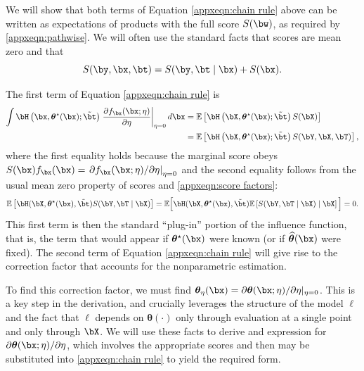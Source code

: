 \documentclass[12pt]{article}
\numberwithin{equation}{section}
\theoremstyle{definition}
\newcommand{\E}{\mathbb{E}}
\newcommand{\btheta}{\boldsymbol{\theta}}
\newcommand{\bttrue}{\btheta^\star}
\newcommand{\btstar}{\tilde{\bt}}
\newcommand{\bthat}{\bm{\widehat{\theta}}}
\begin{document}
\begin{appendices}
We will show that both terms of Equation \eqref{appxeqn:chain rule} above can be written as expectations of products with the full score $S(\bw)$, as required by \eqref{appxeqn:pathwise}. We will often use the standard facts that scores are mean zero and that 
\begin{equation}
	\label{appxeqn:score factors}
	S(\by,\bx,\bt) = S(\by,\bt \mid \bx) + S(\bx).
\end{equation}



The first term of Equation \eqref{appxeqn:chain rule} is 
\begin{align}
	\int \bH\left(\bx, \bttrue(\bx); \btstar\right) \left. \frac{\partial f_{\bx}(\bx; \eta)}{\partial \eta} \right\vert_{\eta=0} d\bx  & = \E\left[ \bH\left(\bX, \bttrue(\bx); \btstar\right) S(\bX)\right] 	  		\nonumber \\
	&  = \E\left[\bH\left(\bX, \bttrue(\bx); \btstar\right) S(\bY,\bX,\bT)\right],   		\label{appxeqn:term1}
\end{align}
where the first equality holds because the marginal score obeys $S(\bx) f_{\bx}(\bx) = \left. \partial f_{\bx}(\bx; \eta) / \partial \eta \right\vert_{\eta=0}$ and the second equality follows from the usual mean zero property of scores and \eqref{appxeqn:score factors}:
\[\E\left[\bH(\bX, \bttrue(\bx), \btstar) S(\bY,\bT \mid \bX) \right] = \E\Big[\bH(\bX, \bttrue(\bx), \btstar) \E\left[  S(\bY,\bT \mid \bX) \mid \bX \right] \Big] = 0.\]
This first term is then the standard ``plug-in'' portion of the influence function, that is, the term that would appear if $\bttrue(\bx)$ were known (or if $\bthat(\bx)$ were fixed). The second term of Equation \eqref{appxeqn:chain rule} will give rise to the correction factor that accounts for the nonparametric estimation.

To find this correction factor, we must find $\btheta_{\eta}(\bx) = \partial \btheta(\bx;\eta) / \partial \eta \vert_{\eta=0}$. This is a key step in the derivation, and crucially leverages the structure of the model $\ell$ and the fact that $\ell$ depends on $\btheta(\cdot)$ only through evaluation at a single point and only through $\bX$. We will use these facts to derive and expression for $\partial \btheta(\bx;\eta) / \partial \eta$, which involves the appropriate scores and then may be substituted into \eqref{appxeqn:chain rule} to yield the required form. 


\end{appendices}
\end{document}
